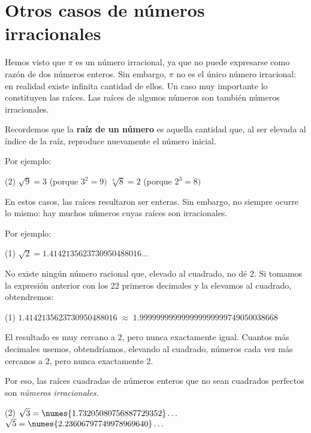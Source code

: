 \section*{Otros casos de números irracionales}
Hemos visto que $\pi$ es un número irracional, ya que no puede expresarse como razón de dos números enteros.
Sin embargo, $\pi$ no es el único número irracional: en realidad existe infinita cantidad de ellos.
Un caso muy importante lo constituyen las raíces. Las raíces de algunos números son también números irracionales.

Recordemos que la \textbf{raíz de un número} es aquella cantidad que, al ser elevada al índice de la raíz, 
reproduce nuevamente el número inicial.  
\clearpage

Por ejemplo:

\begin{ejemplos2shortbull}(2)
  \task $\sqrt{9} = 3$ \quad (porque $3^2 = 9)$
  \task $\sqrt[3]{8} = 2$ \quad (porque $2^3 = 8)$
\end{ejemplos2shortbull}


En estos casos, las raíces resultaron ser enteras.  
Sin embargo, no siempre ocurre lo mismo: hay muchos números cuyas raíces son irracionales.  

Por ejemplo:

\begin{ejemplos1bullet}(1)
  \task $\sqrt{2} = \num{1.4142135623730950488016}\ldots$
\end{ejemplos1bullet}

No existe ningún número racional que, elevado al cuadrado, no dé 2.  Si tomamos la expresión
anterior con los 22 primeros decimales y la elevamos al cuadrado, obtendremos:

\begin{ejemplos1bullet}(1)
  \task $1.4142135623730950488016 \;\approx\; 1.999999999999999999999749050038668$
\end{ejemplos1bullet}

El resultado es muy cercano a 2, pero nunca exactamente igual.  
Cuantos más decimales usemos, obtendríamos, elevando al cuadrado, números cada vez más cercanos
a 2, pero nunca exactamente 2.  

Por eso, las raíces cuadradas de números enteros que no sean cuadrados perfectos son \textit{números irracionales.} 

\begin{ejemplos2shortbull}(2)
  \task $\sqrt{3} = \numes{1.73205080756887729352}\ldots$
  \task $\sqrt{5} = \numes{2.23606797749978969640}\ldots$
\end{ejemplos2shortbull}


